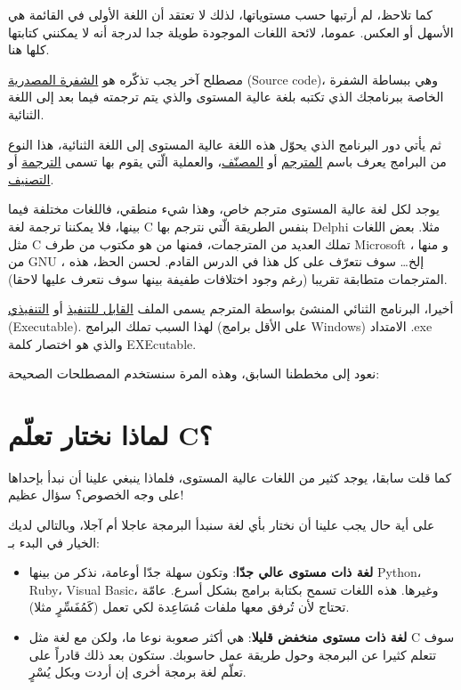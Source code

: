 كما تلاحظ، لم أرتبها حسب مستوياتها، لذلك لا تعتقد أن اللغة الأولى في القائمة هي الأسهل أو العكس. عموما، لائحة اللغات الموجودة طويلة جدا لدرجة أنه لا يمكنني كتابتها كلها هنا.

مصطلح آخر يجب تذكّره هو
\underline{الشفرة المصدرية}
(\textenglish{Source code})،
 وهي ببساطة الشفرة الخاصة ببرنامجك الذي تكتبه بلغة عالية المستوى والذي يتم ترجمته فيما بعد إلى اللغة الثنائية.

 ثم يأتي دور البرنامج الذي يحوّل هذه اللغة عالية المستوى إلى اللغة الثنائية، هذا النوع من البرامج يعرف باسم
 \underline{المترجم}
  أو
  \underline{المصنّف}،
 والعملية الّتي يقوم بها تسمى
 \underline{الترجمة}
 أو
 \underline{التصنيف}.

\begin{information}
  يوجد لكل لغة عالية المستوى مترجم خاص، وهذا شيء منطقي، فاللغات مختلفة فيما بينها، فلا يمكننا ترجمة لغة
\textenglish{C}
بنفس الطريقة الّتي نترجم بها
\textenglish{Delphi}
مثلا.
  بعض اللغات مثل
\textenglish{C}
تملك العديد من المترجمات، فمنها من هو مكتوب من طرف
\textenglish{Microsoft}
، و منها من
\textenglish{GNU}
، إلخ… سوف نتعرّف على كل هذا في الدرس القادم.
  لحسن الحظ، هذه المترجمات متطابقة تقريبا (رغم وجود اختلافات طفيفة بينها سوف نتعرف عليها لاحقا).
\end{information}

أخيرا، البرنامج الثنائي المنشئ بواسطة المترجم يسمى الملف
\underline{القابل للتنفيذ}
أو
\underline{التنفيذي}
(\textenglish{Executable}).
 لهذا السبب تملك البرامج
 (على الأقل برامج
 \textenglish{Windows})
 الامتداد
\textenglish{.exe}
 والذي هو اختصار كلمة
 \textenglish{EXEcutable}.

 نعود إلى مخططنا السابق، وهذه المرة سنستخدم المصطلحات الصحيحة:


 \section{لماذا نختار تعلّم \textenglish{C}؟}
 كما قلت سابقا، يوجد كثير من اللغات عالية المستوى، فلماذا ينبغي علينا أن نبدأ بإحداها على وجه الخصوص؟ سؤال عظيم!

على أية حال يجب علينا أن نختار بأي لغة سنبدأ البرمجة عاجلا أم آجلا، وبالتالي لديك الخيار في البدء بـ:
\begin{itemize}
  \item \textbf{لغة ذات مستوى عالي جدّا}:
 وتكون سهلة جدّا أوعامة، نذكر من بينها
 \textenglish{Python}، \textenglish{Ruby}، \textenglish{Visual Basic}،
 وغيرها. هذه اللغات تسمح بكتابة برامج بشكل أسرع. عامّة تحتاج لأن تُرفق معها ملفات مُسَاعِدة لكي تعمل (كَمُفَسِّرٍ مثلا).
  \item \textbf{لغة ذات مستوى منخفض قليلا}:
هي أكثر صعوبة نوعا ما، ولكن مع لغة مثل
\textenglish{C}
 سوف تتعلم كثيرا عن البرمجة وحول طريقة عمل حاسوبك. ستكون بعد ذلك قادراً على تعلّم لغة برمجة أخرى إن أردت وبكل يُسْرٍ.
\end{itemize}

